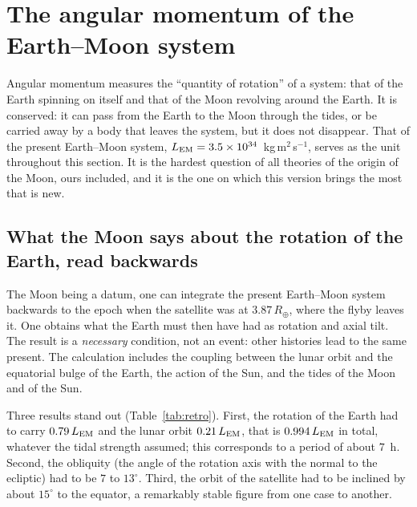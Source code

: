 \documentclass[11pt,a4paper]{article}
\newcommand{\Rt}{\ensuremath{R_\oplus}}
\newcommand{\LEM}{\ensuremath{L_{\rm EM}}}
\begin{document}
\section{The angular momentum of the Earth--Moon system}
\label{sec:AM}

Angular momentum measures the ``quantity of rotation'' of a system: that of the Earth spinning on itself and that of the Moon revolving around the Earth. It is conserved: it can pass from the Earth to the Moon through the tides, or be carried away by a body that leaves the system, but it does not disappear. That of the present Earth--Moon system, $\LEM=3.5\times10^{34}$~kg\,m$^2$\,s$^{-1}$, serves as the unit throughout this section. It is the hardest question of all theories of the origin of the Moon, ours included, and it is the one on which this version brings the most that is new.

\subsection{What the Moon says about the rotation of the Earth, read backwards}
\label{sec:obl}

The Moon being a datum, one can integrate the present Earth--Moon system backwards to the epoch when the satellite was at $3.87\,\Rt$, where the flyby leaves it. One obtains what the Earth must then have had as rotation and axial tilt. The result is a \emph{necessary} condition, not an event: other histories lead to the same present. The calculation includes the coupling between the lunar orbit and the equatorial bulge of the Earth, the action of the Sun, and the tides of the Moon and of the Sun.

Three results stand out (Table~\ref{tab:retro}). First, the rotation of the Earth had to carry $0.79\,\LEM$ and the lunar orbit $0.21\,\LEM$, that is $0.994\,\LEM$ in total, whatever the tidal strength assumed; this corresponds to a period of about $7$~h. Second, the obliquity (the angle of the rotation axis with the normal to the ecliptic) had to be $7$ to $13^\circ$. Third, the orbit of the satellite had to be inclined by about $15^\circ$ to the equator, a remarkably stable figure from one case to another.
\end{document}
